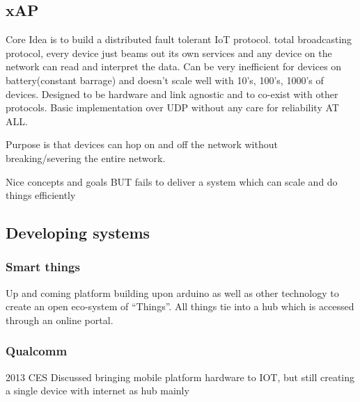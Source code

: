 \documentclass{l4proj}
\begin{document}
\subsection{xAP} %
\label{sub:xap}
\cite{xAP}

Core Idea is to build a distributed fault tolerant IoT protocol.
total broadcasting protocol, every device just beams out its own services and any device on the network can read and interpret the data.
Can be very inefficient for devices on battery(constant barrage) and doesn't scale well with 10's, 100's, 1000's of devices.
Designed to be hardware and link agnostic and to co-exist with other protocols. Basic implementation over UDP without any care for reliability AT ALL.

Purpose is that devices can hop on and off the network without breaking/severing the entire network.

Nice concepts and goals
BUT fails to deliver a system which can scale and do things efficiently


\subsection{Developing systems} %
\label{sub:developing_systems}

\subsubsection{Smart things} %
\label{ssub:smart_things}
Up and coming platform building upon arduino as well as other technology to create an open eco-system of ``Things''. All things tie into a hub which is accessed through an online portal.



\subsubsection{Qualcomm} %
\label{ssub:qualcomm}
2013 CES Discussed bringing mobile platform hardware to IOT, but still creating a single device with internet as hub mainly 



\end{document}
